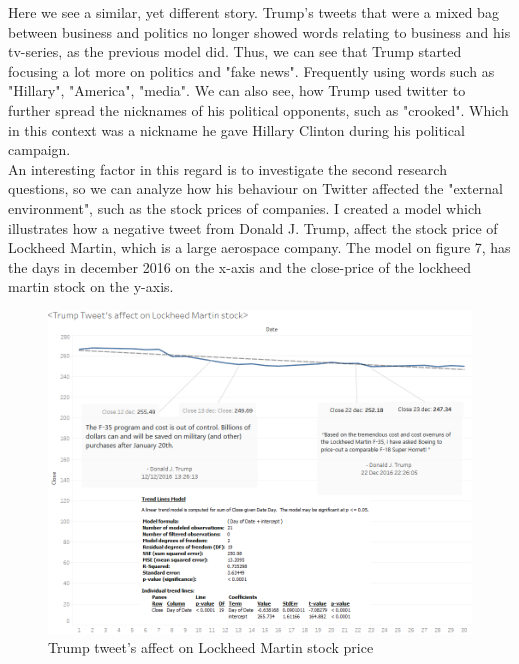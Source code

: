 \documentclass[12pt]{article}
\begin{document}
Here we see a similar, yet different story. Trump's tweets that were a mixed bag between business and politics no longer showed words relating to business and his tv-series,  as the  previous model did. Thus, we can see that Trump started focusing a lot more on politics and "fake news". Frequently using words such as "Hillary", "America", "media". We can also see, how Trump used twitter to further spread the nicknames of his political opponents, such as "crooked". Which in this context was a nickname he gave Hillary Clinton during his political campaign.\\

An interesting factor in this regard is to investigate the second research questions, so we can analyze how his behaviour on Twitter affected the "external environment", such as the stock prices of companies. I created a model which illustrates how a negative tweet from Donald J. Trump, affect the stock price of Lockheed Martin, which is a large aerospace company. The model on figure 7, has the days in december 2016 on the x-axis and the close-price of the lockheed martin stock on the y-axis.

\begin{figure}[H] %
	\centering %
\includegraphics [scale= .45]  {lockfinal.png}    %
	\caption[Optional caption] {Trump tweet's affect on Lockheed Martin stock price}
	\label{fig:wordcloudBliz}

\end{figure}
\end{document}
